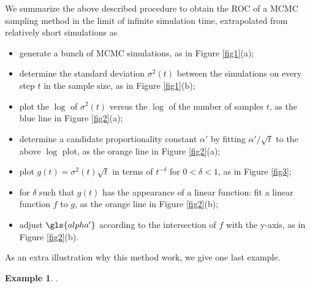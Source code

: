 \documentclass[a4paper, twoside, 11pt]{report}
\theoremstyle{plain}
\theoremstyle{definition}
\newtheorem{example}[thm]{Example}
\theoremstyle{remark}
\begin{document}
We summarize the above described procedure to obtain the ROC of a MCMC sampling method in the limit of infinite simulation time, extrapolated from relatively short simulations as
\begin{itemize}
\item generate a bunch of MCMC simulations, as in Figure \ref{fig1}(a);
\item determine the standard deviation ${\sigma}^2(t)$ between the simulations on every step $t$ in the sample size, as in Figure \ref{fig1}(b);
\item plot the $\log$ of ${\sigma}^2(t)$ versus the $\log$ of the number of samples $t$, as the blue line in Figure \ref{fig2}(a);
\item determine a candidate proportionality constant $\alpha'$ by fitting $\alpha' / \sqrt{t}$ to the above $\log$ plot, as the orange line in Figure \ref{fig2}(a);
\item plot $g(t) = {\sigma}^2(t) \sqrt{t}$ in terms of $t^{-\delta}$ for $0 < \delta < 1$, as in Figure \ref{fig3};
\item for $\delta$ such that $g(t)$ has the appearance of a linear function: fit a linear function $f$ to $g$, as the orange line in Figure \ref{fig2}(b);
\item adjust $\gls{alpha'}$ according to the intersection of $f$ with the y-axis, as in Figure \ref{fig2}(b).
\end{itemize}
As an extra illustration why this method work, we give one last example.
\begin{example}
.
\end{example}
\vspace{8pc}
\end{document}
